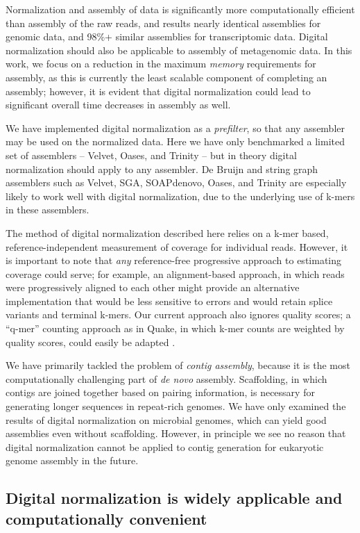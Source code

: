 \documentclass{pnastwo}
\begin{document}
\begin{article}
Normalization and assembly of data is significantly more
computationally efficient than assembly of the raw reads, and results
nearly identical assemblies for genomic data, and 98\%+ similar
assemblies for transcriptomic data.  Digital normalization should also
be applicable to assembly of metagenomic data.  In this work, we focus
on a reduction in the maximum {\em memory} requirements for assembly,
as this is currently the least scalable component of completing an
assembly; however, it is evident that digital normalization could lead
to significant overall time decreases in assembly as well.

We have implemented digital normalization as a {\em prefilter}, so
that any assembler may be used on the normalized data.  Here we have
only benchmarked a limited set of assemblers -- Velvet, Oases, and
Trinity -- but in theory digital normalization should apply to any
assembler.  De Bruijn and string graph assemblers such as Velvet, SGA,
SOAPdenovo, Oases, and Trinity are especially likely to work well with
digital normalization, due to the underlying use of k-mers in these
assemblers.

The method of digital normalization described here relies on a k-mer
based, reference-independent measurement of coverage for individual
reads.  However, it is important to note that {\em any} reference-free
progressive approach to estimating coverage could serve; for example,
an alignment-based approach, in which reads were progressively aligned
to each other might provide an alternative implementation that would
be less sensitive to errors and would retain splice variants and
terminal k-mers.  Our current approach also ignores quality scores; a
``q-mer'' counting approach as in Quake, in which k-mer counts are
weighted by quality scores, could easily be adapted
\cite{pubmed21114842}.

We have primarily tackled the problem of {\em contig assembly},
because it is the most computationally challenging part of {\em de
  novo} assembly.  Scaffolding, in which contigs are joined together
based on pairing information, is necessary for generating longer
sequences in repeat-rich genomes.  We have only examined the results
of digital normalization on microbial genomes, which can yield good
assemblies even without scaffolding.  However, in principle we see no
reason that digital normalization cannot be applied to contig
generation for eukaryotic genome assembly in the future.

\subsection{Digital normalization is widely applicable and computationally convenient}


\end{article}
\end{document}
